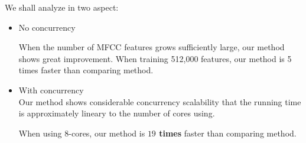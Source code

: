 We shall analyze in two aspect:
\begin{itemize}
    \item No concurrency

             When the number of MFCC features grows sufficiently large, our method
                shows great improvement. When training 512,000 features, our method
                is 5 times faster than comparing method.
    \item With concurrency \\
        Our method shows considerable concurrency scalability that the running time
        is approximately lineary to the number of cores using.

        When using 8-cores, our method is \textbf{$19$ times} faster than comparing
        method.
\end{itemize}



